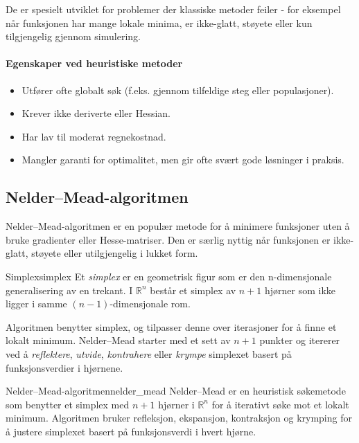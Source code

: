De er spesielt utviklet for problemer der klassiske metoder feiler - for eksempel når funksjonen har mange lokale minima, er ikke-glatt, støyete eller kun tilgjengelig gjennom simulering.

\paragraph{Egenskaper ved heuristiske metoder}

\begin{itemize}
	\item Utfører ofte globalt søk (f.eks. gjennom tilfeldige steg eller populasjoner).
	\item Krever ikke deriverte eller Hessian.
	\item Har lav til moderat regnekostnad.
	\item Mangler garanti for optimalitet, men gir ofte svært gode løsninger i praksis.
\end{itemize}

\subsection{Nelder--Mead-algoritmen}
\label{sec:nelder_mead}

Nelder--Mead-algoritmen er en populær metode for å minimere funksjoner uten å bruke gradienter eller Hesse-matriser.
Den er særlig nyttig når funksjonen er ikke-glatt, støyete eller utilgjengelig i lukket form.

\begin{definition}{Simplex}{simplex}
	Et \emph{simplex} er en geometrisk figur som er den n-dimensjonale generalisering av en trekant. I $\mathbb{R}^n$ består et simplex av $n+1$ hjørner som ikke ligger i samme $(n-1)$-dimensjonale rom.
\end{definition}

Algoritmen benytter simplex, og tilpasser denne over iterasjoner for å finne et lokalt minimum.
Nelder--Mead starter med et sett av \( n+1 \) punkter og itererer ved å \emph{reflektere}, \emph{utvide}, \emph{kontrahere} eller \emph{krympe} simplexet basert på funksjonsverdier i hjørnene.

\begin{definition}{Nelder--Mead-algoritmen}{nelder_mead}
	Nelder--Mead er en heuristisk søkemetode som benytter et simplex med \( n+1 \) hjørner i \( \mathbb{R}^n \) for å iterativt søke mot et lokalt minimum.
	Algoritmen bruker refleksjon, ekspansjon, kontraksjon og krymping for å justere simplexet basert på funksjonsverdi i hvert hjørne.
\end{definition}

